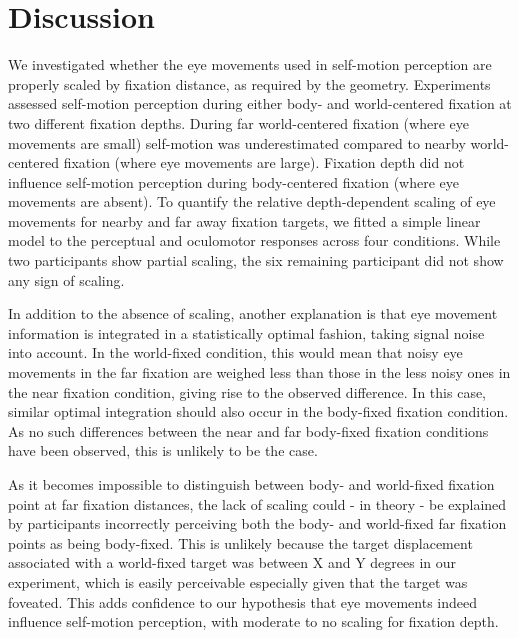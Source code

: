\section{Discussion}

We investigated whether the eye movements used in self-motion perception \cite{clemens2015a} are properly scaled by fixation distance, as required by the geometry. Experiments assessed self-motion perception during either body- and world-centered fixation at two different fixation depths. During far world-centered fixation (where eye movements are small) self-motion was underestimated compared to nearby world-centered fixation (where eye movements are large). Fixation depth did not influence self-motion perception during body-centered fixation (where eye movements are absent). To quantify the relative depth-dependent scaling of eye movements for nearby and far away fixation targets, we fitted a simple linear model to the perceptual and oculomotor responses across four conditions. While two participants show partial scaling, the six remaining participant did not show any sign of scaling.

In addition to the absence of scaling, another explanation is that eye movement information is integrated in a statistically optimal fashion, taking signal noise into account. In the world-fixed condition, this would mean that noisy eye movements in the far fixation are weighed less than those in the less noisy ones in the near fixation condition, giving rise to the observed difference. In this case, similar optimal integration should also occur in the body-fixed fixation condition. As no such differences between the near and far body-fixed fixation conditions have been observed, this is unlikely to be the case.

As it becomes impossible to distinguish between body- and world-fixed fixation point at far fixation distances, the lack of scaling could - in theory - be explained by participants incorrectly perceiving both the body- and world-fixed far fixation points as being body-fixed. This is unlikely because the target displacement associated with a world-fixed target was between X and Y degrees in our experiment, which is easily perceivable especially given that the target was foveated. This adds confidence to our hypothesis that eye movements indeed influence self-motion perception, with moderate to no scaling for fixation depth.

